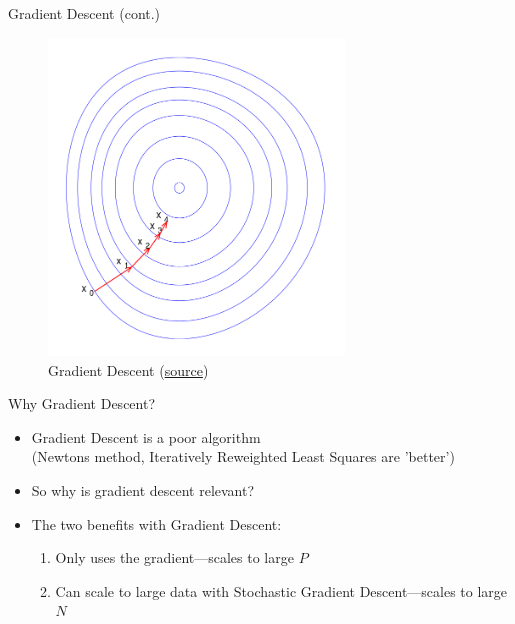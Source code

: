 \documentclass[10pt]{beamer}
\begin{document}
\begin{frame}{Gradient Descent (cont.)}

\begin{figure}[h]
\caption{Gradient Descent (\href{https://en.wikipedia.org/wiki/Gradient_descent}{source})}
\centering
\includegraphics[width=0.7\textwidth]{figs/GD.png}
\end{figure}

\end{frame}




\begin{frame}{Why Gradient Descent?}


\begin{itemize}
\item Gradient Descent is a poor algorithm \\ (Newtons method, Iteratively Reweighted Least Squares are 'better')
\item So why is gradient descent relevant?\pause
\item The two benefits with Gradient Descent:
\begin{enumerate}
\item Only uses the gradient---scales to large $P$
\item Can scale to large data with Stochastic Gradient Descent---scales to large $N$
\end{enumerate}
\end{itemize}

\end{frame}
\end{document}
